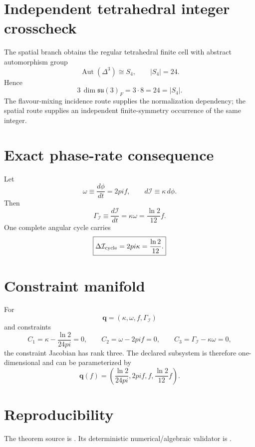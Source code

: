 \documentclass[11pt,a4paper,twoside]{book}
\def\pi{pi}%
\theoremstyle{definition}
\begin{document}
\section{Independent tetrahedral integer crosscheck}
The spatial branch obtains the regular tetrahedral finite cell with abstract
automorphism group
\[
\operatorname{Aut}(\Delta^3)\cong S_4,
\qquad
|S_4|=24.
\]
Hence
\begin{equation}
\boxed{
3\,\dim\mathfrak{su}(3)_F
=3\cdot8
=24
=|S_4|.
}
\label{eq:v12-kappa-tetra-crosscheck}
\end{equation}
The flavour-mixing incidence route supplies the normalization dependency; the
spatial route supplies an independent finite-symmetry occurrence of the same
integer.

\section{Exact phase-rate consequence}
Let
\[
\omega\equiv\frac{d\phi}{dt}=2\pi f,
\qquad
d\mathcal I\equiv\kappa\,d\phi.
\]
Then
\begin{equation}
\boxed{
\Gamma_{\mathcal I}
\equiv\frac{d\mathcal I}{dt}
=\kappa\omega
=\frac{\ln2}{12}f.
}
\label{eq:v12-kappa-phase-rate}
\end{equation}
One complete angular cycle carries
\begin{equation}
\boxed{
\Delta\mathcal I_{\rm cycle}
=2\pi\kappa
=\frac{\ln2}{12}.
}
\label{eq:v12-kappa-information-cycle}
\end{equation}

\section{Constraint manifold}
For
\[
\mathbf q=(\kappa,\omega,f,\Gamma_{\mathcal I})
\]
and constraints
\[
C_1=\kappa-\frac{\ln2}{24\pi}=0,
\qquad
C_2=\omega-2\pi f=0,
\qquad
C_3=\Gamma_{\mathcal I}-\kappa\omega=0,
\]
the constraint Jacobian has rank three.  The declared subsystem is therefore
one-dimensional and can be parameterized by
\begin{equation}
\boxed{
\mathbf q(f)=
\left(
\frac{\ln2}{24\pi},
2\pi f,
f,
\frac{\ln2}{12}f
\right).
}
\label{eq:v12-kappa-constraint-curve}
\end{equation}

\section{Reproducibility}
The theorem source is
.
Its deterministic numerical/algebraic validator is
.
\end{document}
